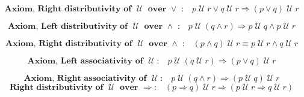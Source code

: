 \documentclass[12pt, fleqn, leqno]{article}
\newcommand{\impl}{\ensuremath{\Rightarrow}}        %
\newcommand{\Until}{\;\mathcal{U}\;}
\newcommand{\firstspacer}{\vspace{-26pt}}
\begin{document}
\firstspacer

\begin{equation}\label{E:untilOrImp}
\textbf{Axiom, Right distributivity of $\Until$ over $\lor$ :}\quad p \Until r \lor q \Until r \impl (p \lor q) \Until r
\end{equation}

\firstspacer

\begin{equation}\label{E:untilAndImp}
\textbf{Axiom, Left distributivity of $\Until$ over $\land$ :}\quad p \Until (q \land r) \impl p \Until q \land p \Until r
\end{equation}

\firstspacer

\begin{equation}\label{E:untilAndEquiv}
\textbf{Axiom, Right distributivity of $\Until$ over $\land$ :}\quad (p \land q) \Until r \equiv p \Until r \land q \Until r
\end{equation}

\firstspacer

\begin{equation}\label{E:leftAssocUntil}
\textbf{Axiom, Left associativity of $\Until$:}\quad p \Until (q \Until r) \impl (p\lor q) \Until r
\end{equation}

\firstspacer

\begin{equation}\label{E:rightAssocUntil}
\textbf{Axiom, Right associativity of $\Until$:}\quad p \Until (q\land r) \impl (p \Until q) \Until r
\end{equation}
\begin{equation}\label{E:rightUntilImplDist}
\textbf{Right distributivity of $\Until$ over $\impl$:}\quad (p \impl q) \Until r\impl (p \Until r \impl q \Until r)
\end{equation}
\end{document}
